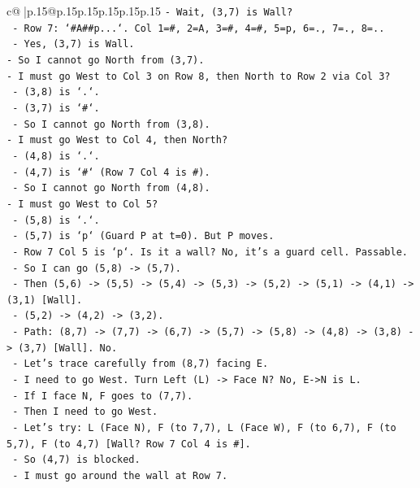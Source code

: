 \documentclass{article}
\begin{document}
{\begin{supertabular}{c@{$\;$}|p{.15\linewidth}@{}p{.15\linewidth}p{.15\linewidth}p{.15\linewidth}p{.15\linewidth}p{.15\linewidth}}
{{{\texttt{{-} Wait, (3,7) is Wall?} \\
\texttt{  {-} Row 7: `\#A\#\#p...`. Col 1=\#, 2=A, 3=\#, 4=\#, 5=p, 6=., 7=., 8=..} \\
\texttt{  {-} Yes, (3,7) is Wall.} \\
\texttt{{-} So I cannot go North from (3,7).} \\
\texttt{{-} I must go West to Col 3 on Row 8, then North to Row 2 via Col 3?} \\
\texttt{  {-} (3,8) is `.`.} \\
\texttt{  {-} (3,7) is `\#`.} \\
\texttt{  {-} So I cannot go North from (3,8).} \\
\texttt{{-} I must go West to Col 4, then North?} \\
\texttt{  {-} (4,8) is `.`.} \\
\texttt{  {-} (4,7) is `\#` (Row 7 Col 4 is \#).} \\
\texttt{  {-} So I cannot go North from (4,8).} \\
\texttt{{-} I must go West to Col 5?} \\
\texttt{  {-} (5,8) is `.`.} \\
\texttt{  {-} (5,7) is `p` (Guard P at t=0). But P moves.} \\
\texttt{  {-} Row 7 Col 5 is `p`. Is it a wall? No, it's a guard cell. Passable.} \\
\texttt{  {-} So I can go (5,8) {-}> (5,7).} \\
\texttt{  {-} Then (5,6) {-}> (5,5) {-}> (5,4) {-}> (5,3) {-}> (5,2) {-}> (5,1) {-}> (4,1) {-}> (3,1) {[}Wall{]}.} \\
\texttt{  {-} (5,2) {-}> (4,2) {-}> (3,2).} \\
\texttt{  {-} Path: (8,7) {-}> (7,7) {-}> (6,7) {-}> (5,7) {-}> (5,8) {-}> (4,8) {-}> (3,8) {-}> (3,7) {[}Wall{]}. No.} \\
\texttt{  {-} Let's trace carefully from (8,7) facing E.} \\
\texttt{  {-} I need to go West. Turn Left (L) {-}> Face N? No, E{-}>N is L.} \\
\texttt{  {-} If I face N, F goes to (7,7).} \\
\texttt{  {-} Then I need to go West.} \\
\texttt{  {-} Let's try: L (Face N), F (to 7,7), L (Face W), F (to 6,7), F (to 5,7), F (to 4,7) {[}Wall? Row 7 Col 4 is \#{]}.} \\
\texttt{  {-} So (4,7) is blocked.} \\
\texttt{  {-} I must go around the wall at Row 7.} \\
}}}
\end{supertabular}}
\end{document}
